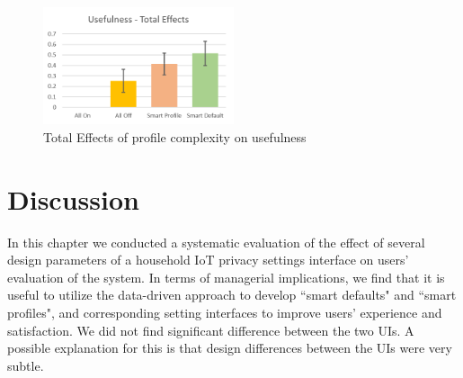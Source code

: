 \begin{figure}
	\centering
	\includegraphics[width=0.5\textwidth]{figures/effectonusefulness.png}
	\caption{Total Effects of profile complexity on usefulness}
	\label{fig:effectonusefulness}
\end{figure}





\section{Discussion}
In this chapter we conducted a systematic evaluation of the effect of several design parameters of a household IoT privacy settings interface on users’ evaluation of the system. In terms of managerial implications, we find that it is useful to utilize the data-driven approach to develop ``smart defaults" and ``smart profiles", and corresponding setting interfaces to improve users' experience and satisfaction. We did not find significant difference between the two UIs. A possible explanation for this is that design differences between the UIs were very subtle.

